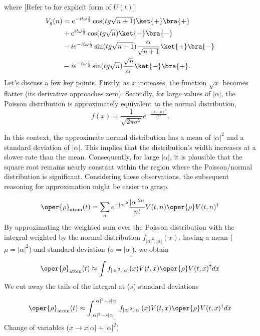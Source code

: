 where [Refer to  for explicit form of \(U(t)\)]:
\begin{align}
        \label{eq:appen_JCM_V_g}
    V_g (n) &=e^{-it\omega\frac{1}{2}}  \cos(tg\sqrt{n + 1})\ket{+}\bra{+}\\
&+ e^{it\omega\frac{1}{2}} \cos(tg\sqrt{n})\ket{-}\bra{-}\\
&- ie^{-it\omega\frac{1}{2}} \sin(tg\sqrt{n + 1}) \frac{\alpha}{\sqrt{n + 1}} \ket{+}\bra{-}\\
&- ie^{-t\omega\frac{1}{2}} \sin(tg\sqrt{n}) \frac{\sqrt{n}}{\alpha} \ket{-}\bra{+}.
\end{align}
Let's discuss a few key points. Firstly, as \( x \) increases, the function 
\( \sqrt{x} \) becomes flatter (its derivative approaches zero). Secondly, 
for large values of \( |\alpha| \), the Poisson distribution is approximately 
equivalent to the normal distribution, 
\begin{equation}
f(x) = \frac{1}{\sqrt{2\pi\sigma^2}} e^{-\frac{(x-\mu)^2}{2\sigma^2}}.
\end{equation}

In this context, the approximate normal distribution has a mean of \( |\alpha|^2 \) and a 
standard deviation of \( |\alpha| \). This implies that the distribution's width increases 
at a slower rate than the mean. Consequently, for large \( |\alpha| \), it is plausible 
that the square root remains nearly constant within the region where the Poisson/normal 
distribution is significant. Considering these observations, the subsequent reasoning 
for approximation might be easier to grasp.

\begin{equation}
\oper{\rho}_{\text{atom}}(t) = \sum_{n} e^{-|\alpha|^2} \frac{|\alpha|^{2n}}{n!} V(t, n) \oper{\rho} V(t, n)^{\dagger}
\end{equation}
By approximating the weighted sum over the Poisson distribution with the integral weighted by 
the normal distribution \( f_{|\alpha|^2, |\alpha|}(x) \), having a mean (\( \mu = |\alpha|^2 \)) 
and standard deviation (\( \sigma = |\alpha| \)), we obtain

\begin{equation}
    \oper{\rho}_{\text{atom}}(t)\approx \int f_{|\alpha|^2, |\alpha|}(x) V(t, x) \oper{\rho} V(t, x)^{\dagger} dx
\end{equation}
We cut away the tails of the integral at (\( s \)) standard deviations

\begin{equation}
    \oper{\rho}_{\text{atom}}(t)\approx \int_{|\alpha|^2 - s|\alpha|}^{|\alpha|^2 + s|\alpha|} f_{|\alpha|^2, |\alpha|}(x) V(t, x) \oper{\rho} V(t, x)^{\dagger} dx
\end{equation}
Change of variables (\( x \to x|\alpha| + |\alpha|^2 \))

